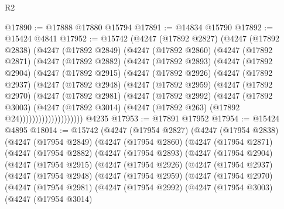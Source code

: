 \begin{lexlean}{R2}
\begin{coremodule}
@17890 := @17888 @17880 @15794
@17891 := @14834 @15790
@17892 := @15424 @4841
@17952 := @15742
    (@4247
      (@17892 @2827)
      (@4247
        (@17892 @2838)
        (@4247
          (@17892 @2849)
          (@4247
            (@17892 @2860)
            (@4247
              (@17892 @2871)
              (@4247
                (@17892 @2882)
                (@4247
                  (@17892 @2893)
                  (@4247
                    (@17892 @2904)
                    (@4247
                      (@17892 @2915)
                      (@4247
                        (@17892 @2926)
                        (@4247
                          (@17892 @2937)
                          (@4247
                            (@17892 @2948)
                            (@4247
                              (@17892 @2959)
                              (@4247
                                (@17892 @2970)
                                (@4247
                                  (@17892 @2981)
                                  (@4247
                                    (@17892 @2992)
                                    (@4247
                                      (@17892 @3003)
                                      (@4247
                                        (@17892 @3014)
                                        (@4247 (@17892 @263) (@17892 @24))))))))))))))))))))
    @4235
@17953 := @17891 @17952
@17954 := @15424 @4895
@18014 := @15742
    (@4247
      (@17954 @2827)
      (@4247
        (@17954 @2838)
        (@4247
          (@17954 @2849)
          (@4247
            (@17954 @2860)
            (@4247
              (@17954 @2871)
              (@4247
                (@17954 @2882)
                (@4247
                  (@17954 @2893)
                  (@4247
                    (@17954 @2904)
                    (@4247
                      (@17954 @2915)
                      (@4247
                        (@17954 @2926)
                        (@4247
                          (@17954 @2937)
                          (@4247
                            (@17954 @2948)
                            (@4247
                              (@17954 @2959)
                              (@4247
                                (@17954 @2970)
                                (@4247
                                  (@17954 @2981)
                                  (@4247
                                    (@17954 @2992)
                                    (@4247
                                      (@17954 @3003)
                                      (@4247
                                        (@17954 @3014)

\end{coremodule}
\end{lexlean}
